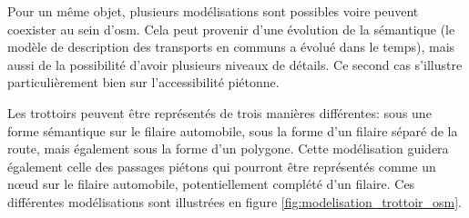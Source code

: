 \label{sec:modelisation_variation_pieton_osm}


Pour un même objet, plusieurs modélisations sont possibles voire peuvent coexister au sein d'\gls{osm}. Cela peut provenir d'une évolution de la sémantique (le modèle de description des transports en communs a évolué dans le temps), mais aussi de la possibilité d'avoir plusieurs niveaux de détails. Ce second cas s'illustre particulièrement bien sur l'accessibilité piétonne.

\newpar{}

Les trottoirs peuvent être représentés de trois manières différentes: sous une forme sémantique sur le filaire automobile, sous la forme d'un filaire séparé de la route, mais également sous la forme d'un polygone. Cette modélisation guidera également celle des passages piétons qui pourront être représentés comme un nœud sur le filaire automobile, potentiellement complété d'un filaire. Ces différentes modélisations sont illustrées en figure \ref{fig:modelisation_trottoir_osm}.

